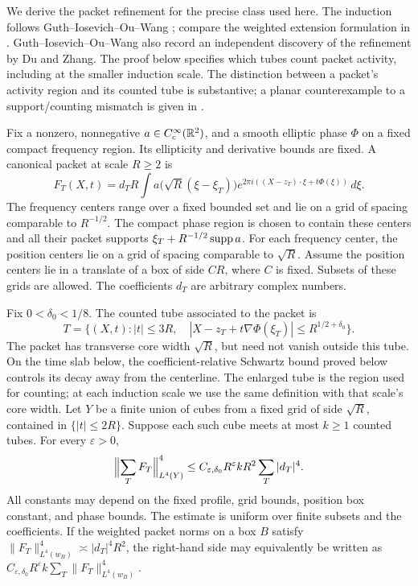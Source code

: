 We derive the packet refinement for the precise class used here. The
induction follows Guth--Iosevich--Ou--Wang
\cite[arXiv:1808.09346v1, proof of Theorem~4.2]{GIOW2020}; compare the
weighted extension formulation in
\cite[arXiv:2411.08871v3, Section~4, Theorem~4.4]{WangWu2024}.
Guth--Iosevich--Ou--Wang also record an independent discovery of
the refinement by Du and Zhang. The proof below specifies which tubes count packet activity, including
at the smaller induction scale. The distinction between a packet's
activity region and its counted tube is substantive; a planar
counterexample to a support/counting mismatch is given in
\cite[arXiv:2608.28711v1, Proposition~2.1]{SinghSingh2026Refined}.

\begin{theorem}
\label{pkt:refined-decoupling}
Fix a nonzero, nonnegative \(a\in C_c^\infty(\mathbb R^2)\), and a smooth
elliptic phase \(\Phi\) on a fixed compact frequency region. Its
ellipticity and derivative bounds are fixed. A canonical packet at
scale \(R\ge2\) is
\[
 F_T(X,t)=d_T R\int
     a\bigl(\sqrt R(\xi-\xi_T)\bigr)
     e^{2\pi i((X-z_T)\cdot\xi+t\Phi(\xi))}\,d\xi .
\]
The frequency centers range over a fixed bounded set and lie on a grid
of spacing comparable to \(R^{-1/2}\). The compact phase region is
chosen to contain these centers and all their packet supports
\(\xi_T+R^{-1/2}\operatorname{supp} a\).
For each frequency center, the position centers lie on a grid of
spacing comparable to \(\sqrt R\). Assume the
position centers lie in a translate of a box of side \(C R\),
where \(C\) is fixed. Subsets of these grids are allowed.
The coefficients \(d_T\) are arbitrary complex numbers.

Fix \(0<\delta_0<1/8\). The counted tube associated to the packet is
\[
 T=\bigl\{(X,t): |t|\le3R,\quad
 |X-z_T+t\nabla\Phi(\xi_T)|\le R^{1/2+\delta_0}\bigr\}.
\]
The packet has transverse core width \(\sqrt R\), but need not vanish
outside this tube.  On the time slab below, the coefficient-relative
Schwartz bound proved below controls its decay away from the centerline.
The enlarged tube is the region used for counting; at each induction
scale we use the same definition with that scale's core width.
Let \(Y\) be a finite union of cubes from a fixed grid of side
\(\sqrt R\), contained in \(\{|t|\le2R\}\). Suppose each such cube
meets at most \(k\ge1\) counted tubes. For every \(\varepsilon>0\),
\begin{equation}\label{pkt:external-decoupling}
 \Bigl\|\sum_TF_T\Bigr\|_{L^4(Y)}^4
 \le C_{\varepsilon,\delta_0}R^\varepsilon
                         k R^2\sum_T|d_T|^4 .
\end{equation}
All constants may depend on the fixed profile, grid bounds, position
box constant, and phase bounds. The estimate is uniform over finite
subsets and the coefficients. If the weighted packet norms on a box
\(B\) satisfy
\(\|F_T\|_{L^4(w_B)}^4\asymp |d_T|^4R^2\), the right-hand side may
equivalently be written as
\(C_{\varepsilon,\delta_0}R^\varepsilon k
\sum_T\|F_T\|_{L^4(w_B)}^4\).
\end{theorem}


